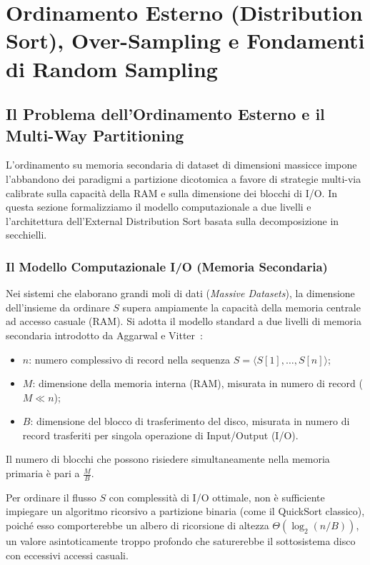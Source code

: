 \chapter{Ordinamento Esterno (Distribution Sort), Over-Sampling e Fondamenti di Random Sampling}
\label{chap:external-distribution-sort}

\FloatBarrier
\section{Il Problema dell'Ordinamento Esterno e il Multi-Way Partitioning}
\label{sec:external-sorting-multiway}

L'ordinamento su memoria secondaria di dataset di dimensioni massicce impone l'abbandono dei paradigmi a partizione dicotomica a favore di strategie multi-via calibrate sulla capacit\`a della RAM e sulla dimensione dei blocchi di I/O. In questa sezione formalizziamo il modello computazionale a due livelli e l'architettura dell'External Distribution Sort basata sulla decomposizione in secchielli.

\FloatBarrier
\subsection{Il Modello Computazionale I/O (Memoria Secondaria)}
Nei sistemi che elaborano grandi moli di dati (\textit{Massive Datasets}), la dimensione dell'insieme da ordinare $S$ supera ampiamente la capacità della memoria centrale ad accesso casuale (RAM). Si adotta il modello standard a due livelli di memoria secondaria introdotto da Aggarwal e Vitter~\cite{aggarwal1988}:
\begin{itemize}
  \item $n$: numero complessivo di record nella sequenza $S = \langle S[1], \dots, S[n] \rangle$;
  \item $M$: dimensione della memoria interna (RAM), misurata in numero di record ($M \ll n$);
  \item $B$: dimensione del blocco di trasferimento del disco, misurata in numero di record trasferiti per singola operazione di Input/Output (I/O).
\end{itemize}

Il numero di blocchi che possono risiedere simultaneamente nella memoria primaria è pari a $\frac{M}{B}$.

Per ordinare il flusso $S$ con complessità di I/O ottimale, non è sufficiente impiegare un algoritmo ricorsivo a partizione binaria (come il QuickSort classico), poiché esso comporterebbe un albero di ricorsione di altezza $\Theta(\log_2(n/B))$, un valore asintoticamente troppo profondo che saturerebbe il sottosistema disco con eccessivi accessi casuali. 

